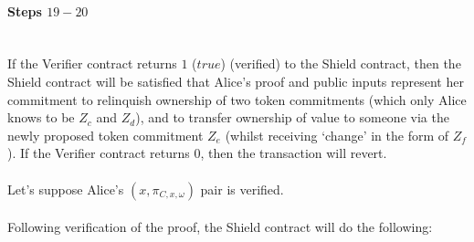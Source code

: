 \documentclass{article}
\begin{document}
\paragraph{Steps $19 - 20$}
\ \\
If the Verifier contract returns $1$ ($true$) (verified) to the Shield contract, then the Shield contract will be satisfied that Alice's proof and public inputs represent her commitment to relinquish ownership of two token commitments (which only Alice knows to be $Z_c$ and $Z_d$), and to transfer ownership of value to someone via the newly proposed token commitment $Z_e$ (whilst receiving `change' in the form of $Z_f$). If the Verifier contract returns $0$, then the transaction will revert.\\
\\
Let's suppose Alice's $(x, \pi_{C,x,\omega})$ pair is verified.\\
\\
Following verification of the proof, the Shield contract will do the following:
\end{document}
